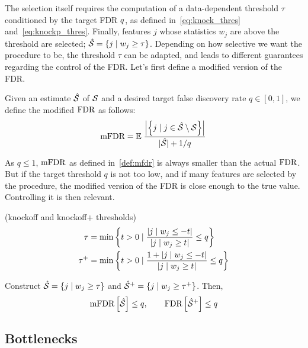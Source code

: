 The selection itself requires the computation of a data-dependent threshold $\tau$
conditioned by the target FDR $q$, as defined in~\ref{eq:knock_thres} and~\ref{eq:knockp_thres}.
Finally, features $j$ whose statistics $w_j$ are above the threshold are selected;
$\hat{\mathcal{S}} = \left\{ j \mid w_j \geq \tau \right\}$.
Depending on how selective we want the procedure to be, the threshold $\tau$ can be adapted,
and leads to different guarantees regarding the control of the FDR\@.
Let's first define a modified version of the FDR\@.
\begin{definition}\label{def:mfdr}
Given an estimate $\hat{\mathcal{S}}$ of $\mathcal{S}$ and a desired target false discovery rate $q \in [0, 1]$,
we define the modified $\text{FDR}$ as follows:
\begin{equation*}
    \text{mFDR} = {\mathbb E}\left.
    \frac
    {\left\lvert\left\{ j \mid j \in \hat{\mathcal{S}} \setminus \mathcal{S} \right\}\right\rvert}
    {\lvert\hat{\mathcal{S}}\rvert + 1 / q}
    \right.
\end{equation*}
\end{definition}
As $q \leq 1$, $\text{mFDR}$ as defined in~\ref{def:mfdr} is always smaller than the actual $\text{FDR}$.
But if the target threshold $q$ is not too low, and if many features are selected by the procedure,
the modified version of the FDR is close enough to the true value.
Controlling it is then relevant.
\begin{definition}
    (knockoff and knockoff+ thresholds)
    \begin{align}
        \tau &=
        \min\left\{
        t > 0 \mid \frac{\left\lvert j \mid w_j \leq -t\right\rvert}{\left\lvert j \mid w_j \geq t\right\rvert} \leq q
        \right\}\label{eq:knock_thres}\\
        \tau^+ &=
        \min\left\{
        t > 0 \mid \frac{1 + \left\lvert j \mid w_j \leq -t\right\rvert}{\left\lvert j \mid w_j \geq t\right\rvert} \leq q
        \right\}\label{eq:knockp_thres}
    \end{align}
\end{definition}

\begin{theorem}
    Construct $\hat{\mathcal{S}} = \left\{ j \mid w_j \geq \tau \right\}$
    and $\hat{\mathcal{S}}^+ = \left\{ j \mid w_j \geq \tau^+ \right\}$.
    Then,
    \begin{equation}
        \text{mFDR}\left[ \hat{\mathcal{S}} \right] \leq q
        ,\qquad
        \text{FDR}\left[ \hat{\mathcal{S}}^+ \right] \leq q
    \end{equation}
\end{theorem}
%
\subsection{Bottlenecks}\label{subsec:kb}

